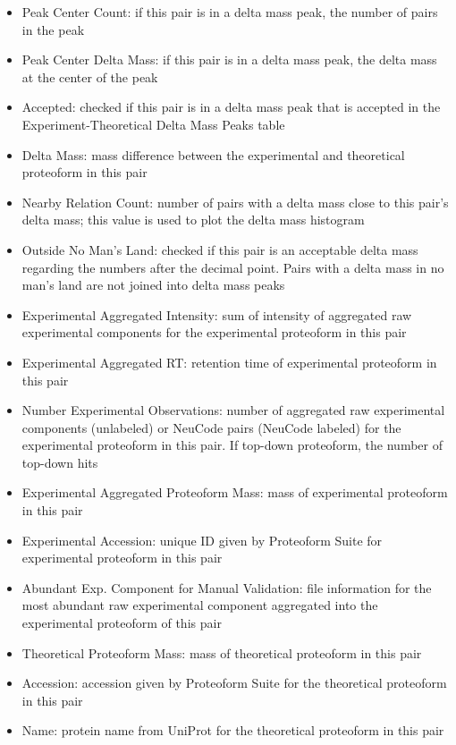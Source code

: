 \begin{itemize}
\begin{figure}[h]
\end{figure}
\begin{itemize}
	\item Peak Center Count: if this pair is in a delta mass peak, the number of pairs in the peak
	\item Peak Center Delta Mass: if this pair is in a delta mass peak, the delta mass at the center of the peak
	\item Accepted: checked if this pair is in a delta mass peak that is accepted in the Experiment-Theoretical Delta Mass Peaks table
	\item Delta Mass: mass difference between the experimental and theoretical proteoform in this pair
	\item Nearby Relation Count: number of pairs with a delta mass close to this pair's delta mass; this value is used to plot the delta mass histogram
	\item Outside No Man's Land: checked if this pair is an acceptable delta mass regarding the numbers after the decimal point. Pairs with a delta mass in no man's land are not joined into delta mass peaks
	\item Experimental Aggregated Intensity: sum of intensity of aggregated raw experimental components for the experimental proteoform in this pair
	\item Experimental Aggregated RT: retention time of experimental proteoform in this pair
	\item Number Experimental Observations: number of aggregated raw experimental components (unlabeled) or NeuCode pairs (NeuCode labeled) for the experimental proteoform in this pair. If top-down proteoform, the number of top-down hits
	\item Experimental Aggregated Proteoform Mass: mass of experimental proteoform in this pair
	\item Experimental Accession: unique ID given by Proteoform Suite for experimental proteoform in this pair		
	\item Abundant Exp. Component for Manual Validation: file information for the most abundant raw experimental component aggregated into the experimental proteoform of this pair
	\item Theoretical Proteoform Mass: mass of theoretical proteoform in this pair
	\item Accession: accession given by Proteoform Suite for the theoretical proteoform in this pair
	\item Name: protein name from UniProt for the theoretical proteoform in this pair

\end{itemize}
\end{itemize}

